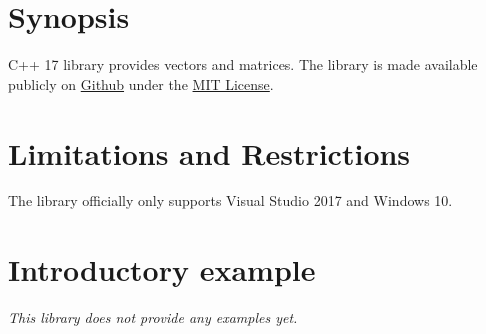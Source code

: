 \documentclass[oneside]{article}
\begin{document}
\maketitle
\tableofcontents
\section{Synopsis}
C++ 17 library provides vectors and matrices.
The library is made available publicly on
\href{\GetLibraryRepository}{Github}
under the
\href{\GetLibraryRepository/blob/master/LICENSE}{MIT License}.

\section{Limitations and Restrictions}
The library officially only supports Visual Studio 2017 and Windows 10.

\section{Introductory example}
\textit{\color{orange}This library does not provide any examples yet.}
\end{document}
